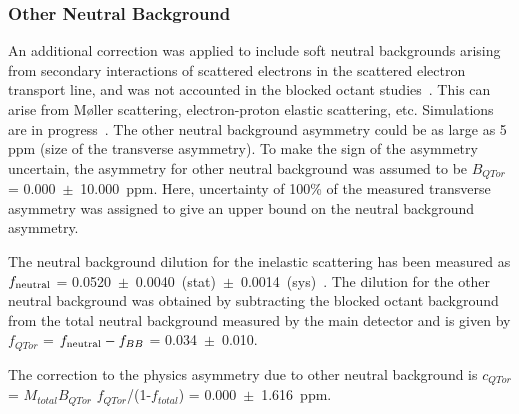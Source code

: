 \subsubsection{Other Neutral Background}
\label{Other Neutral Background}
An additional correction was applied to include soft neutral backgrounds arising from secondary interactions of scattered electrons in the scattered electron transport line, and was not accounted in the blocked octant studies~\cite{elog:mack_analysis714}. 
This can arise from M{\o}ller scattering, electron-proton elastic scattering, etc. Simulations are in progress~\cite{presentation:marty_2072}.
The other neutral background asymmetry could be as large as 5 ppm (size of the transverse asymmetry).
To make the sign of the asymmetry uncertain, the asymmetry for other neutral background was assumed to be $B_{QTor}$ = 0.000~$\pm$~10.000~ppm. Here, uncertainty of 100\% of the measured transverse asymmetry was assigned to give an upper bound on the neutral background asymmetry. 

The neutral background dilution for the inelastic scattering has been measured as $f_{\rm neutral}$ = 0.0520~$\pm$~0.0040~(stat)~$\pm$~0.0014~(sys)~\cite{rakitha_neutral_background}. The dilution for the other neutral background was obtained by subtracting the blocked octant background from the total neutral background measured by the main detector and is given by $f_{QTor}$ = $f_{\rm neutral} - f_{BB}$ = 0.034~$\pm$~0.010. 

The correction to the physics asymmetry due to other neutral background is $c_{QTor}$ = $M_{total}B_{QTor}$ $f_{QTor}$/(1-$f_{total}$) = 0.000~$\pm$~1.616~ppm.


